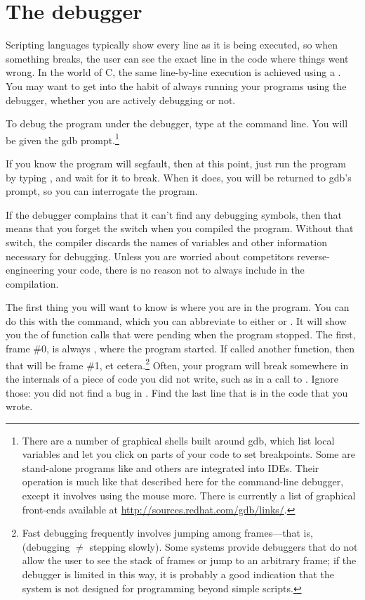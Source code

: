 \section{The debugger}   \label{debug}
Scripting languages typically show every line as it is being executed,
so when something breaks, the user can see the exact line in the code
where things went wrong. In the world of C, the same line-by-line
execution is achieved using a . You may want to get into the
habit of always running your programs using the debugger, whether you
are actively debugging or not.

To debug the program  under the debugger, type  at the command line.  You will be given the gdb
prompt.\footnote{There are a number of graphical shells built
around gdb, which list local variables and let you click on parts of
your code to set breakpoints. Some are stand-alone programs like  and others are integrated into IDEs. Their operation is much like 
that described here for the command-line debugger, except
it involves using the mouse more. There is currently a list of graphical
front-ends available at \url{http://sources.redhat.com/gdb/links/}.}

If you know the program will segfault, then at this point, just run the program
by typing , and wait for it to break. When it does, you will
be returned to gdb's prompt, so you can interrogate the 
program. 

If the debugger complains that it can't find
any debugging symbols, then that means that you forget the 
switch when you compiled the program. Without that switch, the compiler
discards the names of variables and other information necessary for
debugging. Unless you are worried about competitors reverse-engineering
your code, there is no reason not to always include  in the
compilation.

The first thing you will want to know is where you are in the program. You
can do this with the  command, which you can abbreviate to
either  or . It will show you the  of function
calls that were pending when the program stopped.  The first, frame
\#0, is always , where the program started. If 
called another function, then that will be frame \#1, et
cetera.\footnote{Fast debugging frequently involves jumping among
frames---that is, (debugging $\neq$ stepping slowly).
Some systems provide debuggers that do not allow the user to see the
stack of frames or jump to an arbitrary frame; if the debugger is limited in
this way, it is probably a good indication that the system is not designed
for programming beyond simple scripts.} Often, your program will break
somewhere in the internals of a piece of code you did not write, such
as in a call to . Ignore those: you did not find a bug in
. Find the last line that is in the code that you wrote.

